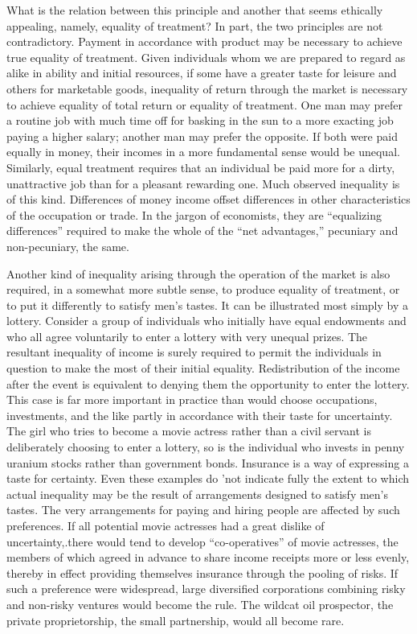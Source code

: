\documentclass[11pt,openany]{book}
\begin{document}
What is the relation between this principle and another that seems ethically appealing, namely, equality of treatment? In part, the two principles are not contradictory. Payment in accordance with product may be necessary to achieve true equality of treatment. Given individuals whom we are prepared to regard as alike in ability and initial resources, if some have a greater taste for leisure and others for marketable goods, inequality of return through the market is necessary to achieve equality of total return or equality of treatment. One man may prefer a routine job with much time off for basking in the sun to a more exacting job paying a higher salary; another man may prefer the opposite. If both were paid equally in money, their incomes in a more fundamental sense would be unequal. Similarly, equal treatment requires that an individual be paid more for a dirty, unattractive job than for a pleasant rewarding one. Much observed inequality is of this kind. Differences of money income offset differences in other characteristics of the occupation or trade. In the jargon of economists, they are ``equalizing differences'' required to make the whole of the ``net advantages,'' pecuniary and non-pecuniary, the same.

Another kind of inequality arising through the operation of the market is also required, in a somewhat more subtle sense, to produce equality of treatment, or to put it differently to satisfy men's tastes. It can be illustrated most simply by a lottery. Consider a group of individuals who initially have equal endowments and who all agree voluntarily to enter a lottery with very unequal prizes. The resultant inequality of income is surely required to permit the individuals in question to make the most of their initial equality. Redistribution of the income after the event is equivalent to denying them the opportunity to enter the lottery. This case is far more important in practice than would choose occupations, investments, and the like partly in accordance with their taste for uncertainty. The girl who tries to become a movie actress rather than a civil servant is deliberately choosing to enter a lottery, so is the individual who invests in penny uranium stocks rather than government bonds. Insurance is a way of expressing a taste for certainty. Even these examples do 'not indicate fully the extent to which actual inequality may be the result of arrangements designed to satisfy men's tastes. The very arrangements for paying and hiring people are affected by such preferences. If all potential movie actresses had a great dislike of uncertainty,.there would tend to develop ``co-operatives'' of movie actresses, the members of which agreed in advance to share income receipts more or less evenly, thereby in effect providing themselves insurance through the pooling of risks. If such a preference were widespread, large diversified corporations combining risky and non-risky ventures would become the rule. The wildcat oil prospector, the private proprietorship, the small partnership, would all become rare.
\end{document}
